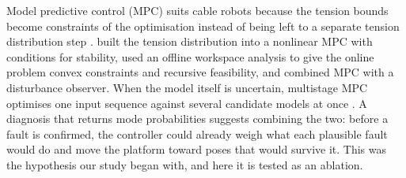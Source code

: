 \documentclass[a4paper,fleqn]{cas-dc}
\begin{document}
Model predictive control (MPC) suits cable robots because the tension bounds become constraints of the optimisation instead of being left to a separate tension distribution step \citep{gouttefarde2015tda}. \citet{santos2022nmpc} built the tension distribution into a nonlinear MPC with conditions for stability, \citet{song2022wmpc} used an offline workspace analysis to give the online problem convex constraints and recursive feasibility, and \citet{gao2025dobmpc} combined MPC with a disturbance observer. When the model itself is uncertain, multistage MPC optimises one input sequence against several candidate models at once \citep{lucia2013multistage}. A diagnosis that returns mode probabilities suggests combining the two: before a fault is confirmed, the controller could already weigh what each plausible fault would do and move the platform toward poses that would survive it. This was the hypothesis our study began with, and here it is tested as an ablation.
\end{document}
